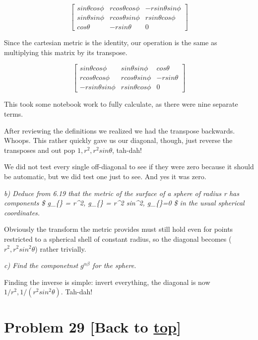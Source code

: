 \documentclass[landscape,letterpaper,10pt,english]{article}
\begin{document}
\[ \begin{bmatrix}
sin\theta cos\phi & rcos\theta cos\phi & - rsin\theta sin\phi \\
sin\theta sin\phi & rcos\theta sin\phi & rsin\theta cos\phi \\
cos\theta & -rsin\theta & 0 
\end{bmatrix}\]

Since the cartesian metric is the identity, our operation is the same as
multiplying this matrix by its transpose.

\[ \begin{bmatrix}
sin\theta cos\phi & sin\theta sin\phi & cos\theta \\
rcos\theta cos\phi & rcos\theta sin\phi & -rsin\theta \\
- rsin\theta sin\phi & rsin\theta cos\phi & 0 
\end{bmatrix}\]

This took some notebook work to fully calculate, as there were nine
separate terms.

    After reviewing the definitions we realized we had the transpose
backwards. Whoops. This rather quickly gave us our diagonal, though,
just reverse the transposes and out pop \(1, r^2, r^2sin\theta\),
tah-dah!

We did not test every single off-diagonal to see if they were zero
because it should be automatic, but we did test one just to see. And yes
it was zero.

    \emph{b) Deduce from 6.19 that the metric of the surface of a sphere of
radius r has components \$ g\_\{\theta\theta\} = r\^{}2, g\_\{\phi\phi\}
= r\^{}2 sin\^{}2\theta, g\_\{\theta\phi\}=0 \$ in the usual spherical
coordinates.}

    Obviously the transform the metric provides must still hold even for
points restricted to a spherical shell of constant radius, so the
diagonal becomes (\(r^2, r^2sin^2\theta\)) rather trivially.

    \emph{c) Find the componetnst \(g^{\alpha\beta}\) for the sphere.}

Finding the inverse is simple: invert everything, the diagonal is now
\(1/r^2, 1/(r^2sin^2\theta)\). Tah-dah!

    \hypertarget{problem-29-back-to-top}{%
\section{\texorpdfstring{Problem 29 {[}Back to
\hyperref[toc]{top}{]}}{Problem 29 {[}Back to {]}}}\label{problem-29-back-to-top}}
\end{document}
